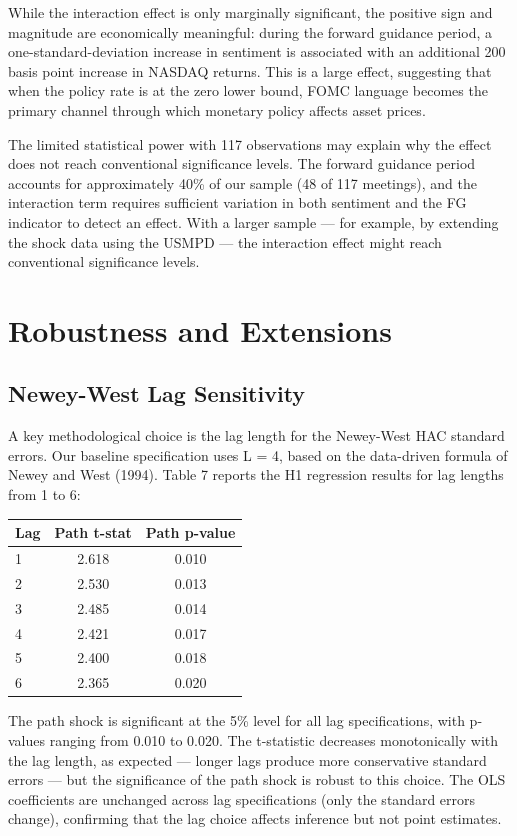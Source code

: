 \documentclass[12pt]{article}
\begin{document}
While the interaction effect is only marginally significant, the positive sign and magnitude are economically meaningful: during the forward guidance period, a one-standard-deviation increase in sentiment is associated with an additional 200 basis point increase in NASDAQ returns. This is a large effect, suggesting that when the policy rate is at the zero lower bound, FOMC language becomes the primary channel through which monetary policy affects asset prices.

The limited statistical power with 117 observations may explain why the effect does not reach conventional significance levels. The forward guidance period accounts for approximately 40\% of our sample (48 of 117 meetings), and the interaction term requires sufficient variation in both sentiment and the FG indicator to detect an effect. With a larger sample --- for example, by extending the shock data using the USMPD --- the interaction effect might reach conventional significance levels.


\section{Robustness and Extensions}

\subsection{Newey-West Lag Sensitivity}

A key methodological choice is the lag length for the Newey-West HAC standard errors. Our baseline specification uses L = 4, based on the data-driven formula of Newey and West (1994). Table 7 reports the H1 regression results for lag lengths from 1 to 6:

\begin{table}[htbp]
\centering
\begin{tabular}{lcc}
\toprule
Lag & Path t-stat & Path p-value \\
\midrule
1 & 2.618 & 0.010 \\
2 & 2.530 & 0.013 \\
3 & 2.485 & 0.014 \\
4 & 2.421 & 0.017 \\
5 & 2.400 & 0.018 \\
6 & 2.365 & 0.020 \\
\bottomrule
\end{tabular}
\end{table}

The path shock is significant at the 5\% level for all lag specifications, with p-values ranging from 0.010 to 0.020. The t-statistic decreases monotonically with the lag length, as expected --- longer lags produce more conservative standard errors --- but the significance of the path shock is robust to this choice. The OLS coefficients are unchanged across lag specifications (only the standard errors change), confirming that the lag choice affects inference but not point estimates.
\end{document}

